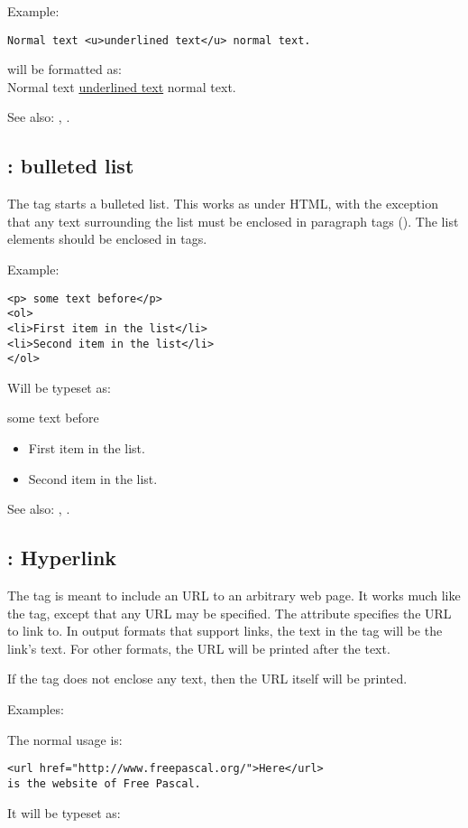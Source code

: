 Example:
\begin{verbatim}
Normal text <u>underlined text</u> normal text.
\end{verbatim}
will be formatted as:\\
Normal text \underline{underlined text} normal text.

See also: , .

\subsection{ : bulleted list}
\label{tag:ul}
The  tag starts a bulleted list. This works as under HTML, with the
exception that any text surrounding the list must be enclosed in paragraph
tags (). The list elements should be enclosed in  tags.

Example:
\begin{verbatim}
<p> some text before</p>
<ol>
<li>First item in the list</li>
<li>Second item in the list</li>
</ol>
\end{verbatim}
Will be typeset as:

some text before
\begin{itemize}
\item First item in the list.
\item Second item in the list.
\end{itemize}

See also: , .


\subsection{ : Hyperlink}
\label{tag:url}
The  tag is meant to include an URL to an arbitrary web page. It
works much like the  tag, except that any URL may be specified.
The attribute  specifies the URL to link to. In output formats
that support links, the text in the  tag will be the link's text.
For other formats, the URL will be printed after the text.

If the  tag does not enclose any text, then the URL itself will
be printed.

Examples:

The normal usage is:
\begin{verbatim}
<url href="http://www.freepascal.org/">Here</url> 
is the website of Free Pascal.
\end{verbatim}
It will be typeset as:

